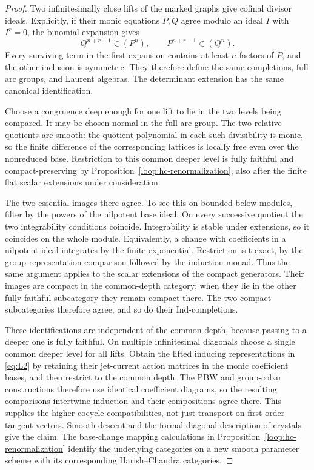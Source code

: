 \documentclass[11pt]{article}
\numberwithin{equation}{section}
\theoremstyle{definition}
\theoremstyle{remark}
\begin{document}
\begin{proof}
Two infinitesimally close lifts of the marked graphs give cofinal
divisor ideals.  Explicitly, if their monic equations $P,Q$ agree
modulo an ideal $I$ with $I^r=0$, the binomial expansion gives
\[
               Q^{n+r-1}\in(P^n),\qquad
               P^{n+r-1}\in(Q^n).
\]
Every surviving term in the first expansion contains at least $n$
factors of $P$, and the other inclusion is symmetric.  They therefore
define the same completions,
full arc groups, and Laurent algebras.  The determinant extension
has the same canonical identification.

Choose a congruence deep enough for one lift to lie in the two
levels being compared.  It may be chosen normal in the full arc
group.  The two relative quotients are smooth: the quotient polynomial
in each such divisibility is monic, so the finite difference of the
corresponding lattices is locally free even over the nonreduced base.
Restriction to this common deeper level is fully faithful and
compact-preserving by Proposition~\ref{loop:hc-renormalization}, also
after the finite flat scalar extensions under consideration.

The two essential images there agree.  To see this on bounded-below
modules, filter by the powers of the nilpotent base ideal.  On every
successive quotient the two integrability conditions coincide.
Integrability is stable under extensions, so it coincides on the
whole module.  Equivalently, a change with coefficients in a
nilpotent ideal integrates by the finite exponential.  Restriction
is t-exact, by the group-representation comparison followed by the
induction monad.  Thus the same argument applies to the scalar
extensions of the compact generators.  Their images are compact in
the common-depth category; when they lie in the other fully faithful
subcategory they remain compact there.  The two compact subcategories
therefore agree, and so do their Ind-completions.

These identifications are independent of the common depth, because
passing to a deeper one is fully faithful.  On multiple
infinitesimal diagonals choose a single common deeper level for
all lifts.  Obtain the lifted inducing representations in \eqref{eq:L2}
by retaining their jet-current action matrices in the monic
coefficient bases, and then restrict to the common depth.  The PBW and group-cobar
constructions therefore use identical coefficient diagrams, so
the resulting comparisons intertwine induction and their compositions
agree there.  This supplies the higher cocycle compatibilities, not just transport on
first-order tangent vectors.  Smooth descent and the formal
diagonal description of crystals give the claim.  The base-change
mapping calculations in Proposition~\ref{loop:hc-renormalization}
identify the underlying categories on a new smooth parameter
scheme with its corresponding Harish--Chandra categories.


\end{proof}
\end{document}
